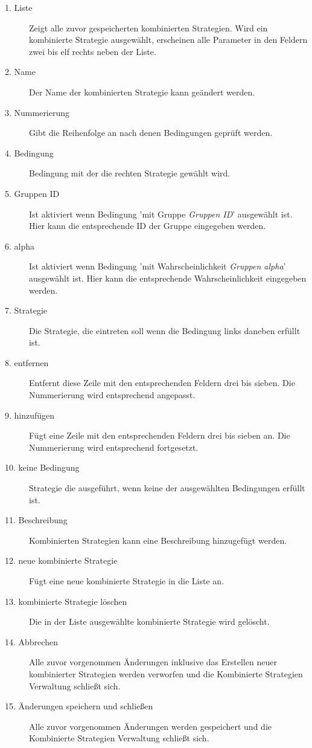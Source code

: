 \begin{description}

\item[1. Liste] Zeigt alle zuvor gespeicherten  kombinierten Strategien. Wird ein kombinierte Strategie ausgewählt, erscheinen alle Parameter in den Feldern zwei bis elf rechts neben der Liste.

\item[2. Name] Der Name der kombinierten Strategie kann geändert werden.

\item[3. Nummerierung] Gibt die Reihenfolge an nach denen Bedingungen geprüft werden.

\item[4. Bedingung] Bedingung mit der die rechten Strategie gewählt wird.

\item[5. Gruppen ID] Ist aktiviert wenn Bedingung 'mit Gruppe \textit{Gruppen ID}' ausgewählt ist. Hier kann die entsprechende ID der Gruppe eingegeben werden.

\item[6. alpha] Ist aktiviert wenn Bedingung 'mit Wahrscheinlichkeit \textit{Gruppen alpha}' ausgewählt ist. Hier kann die entsprechende Wahrscheinlichkeit eingegeben werden.

\item[7. Strategie] Die Strategie, die eintreten soll wenn die Bedingung links daneben erfüllt ist.

\item[8. entfernen] Entfernt diese Zeile mit den entsprechenden Feldern drei bis sieben. Die Nummerierung wird entsprechend angepasst.

\item[9. hinzufügen] Fügt eine Zeile mit den entsprechenden Feldern drei bis sieben an. Die Nummerierung wird entsprechend fortgesetzt.

\item[10. keine Bedingung] Strategie die ausgeführt, wenn keine der ausgewählten Bedingungen erfüllt ist.

\item[11. Beschreibung] Kombinierten Strategien kann eine Beschreibung hinzugefügt werden.

\item[12. neue kombinierte Strategie] Fügt eine neue kombinierte Strategie in die Liste an. 

\item[13. kombinierte Strategie löschen] Die in der Liste ausgewählte kombinierte Strategie wird gelöscht.

\item[14. Abbrechen] Alle zuvor vorgenommen Änderungen inklusive das Erstellen neuer kombinierter Strategien werden verworfen und die Kombinierte Strategien Verwaltung schließt sich. 

\item[15. Änderungen speichern und schließen] Alle zuvor vorgenommen Änderungen werden gespeichert und die Kombinierte Strategien Verwaltung schließt sich.

\end{description}

